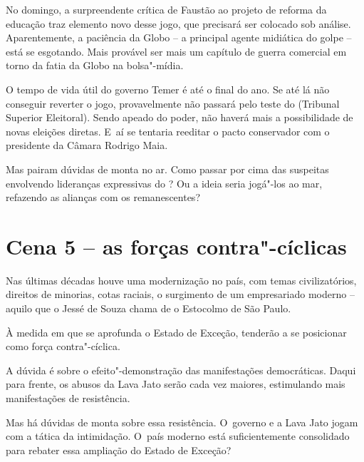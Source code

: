 No domingo, a surpreendente crítica de Faustão ao projeto de reforma da
educação traz elemento novo desse jogo, que precisará ser colocado sob
análise. Aparentemente, a paciência da Globo -- a principal agente
midiática do golpe -- está se esgotando. Mais provável ser mais um
capítulo de guerra comercial em torno da fatia da Globo na bolsa"-mídia.

O tempo de vida útil do governo Temer é até o final do ano. Se até lá
não conseguir reverter o jogo, provavelmente não passará pelo teste do
 (Tribunal Superior Eleitoral). Sendo apeado do poder, não haverá
mais a possibilidade de novas eleições diretas. E~aí se tentaria
reeditar o pacto conservador com o presidente da Câmara Rodrigo Maia.

Mas pairam dúvidas de monta no ar. Como passar por cima das suspeitas
envolvendo lideranças expressivas do ? Ou a ideia seria jogá"-los ao
mar, refazendo as alianças com os remanescentes?

\section{Cena 5 -- as forças contra"-cíclicas}

Nas últimas décadas houve uma modernização no país, com temas
civilizatórios, direitos de minorias, cotas raciais, o surgimento de um
empresariado moderno -- aquilo que o Jessé de Souza chama de o Estocolmo
de São Paulo.

À medida em que se aprofunda o Estado de Exceção, tenderão a se
posicionar como força contra"-cíclica.

A dúvida é sobre o efeito"-demonstração das manifestações democráticas.
Daqui para frente, os abusos da Lava Jato serão cada vez maiores,
estimulando mais manifestações de resistência.

Mas há dúvidas de monta sobre essa resistência. O~governo e a Lava Jato
jogam com a tática da intimidação. O~país moderno está suficientemente
consolidado para rebater essa ampliação do Estado de Exceção?
